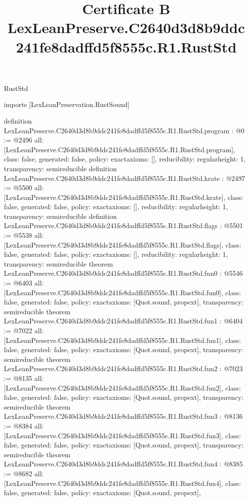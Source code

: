 \begin{lexlean}{RustStd}
\title{Certificate B LexLeanPreserve.C2640d3d8b9ddc241fe8dadffd5f8555c.R1.RustStd}
\begin{coremodule}
imports [LexLeanPreservation.RustSound]

definition LexLeanPreserve.C2640d3d8b9ddc241fe8dadffd5f8555c.R1.RustStd.program : @0 := @2496 {
  all: [LexLeanPreserve.C2640d3d8b9ddc241fe8dadffd5f8555c.R1.RustStd.program],
  class: false,
  generated: false,
  policy: exact{axioms: []},
  reducibility: regular{height: 1},
  transparency: semireducible
}
definition LexLeanPreserve.C2640d3d8b9ddc241fe8dadffd5f8555c.R1.RustStd.krate : @2497 := @5500 {
  all: [LexLeanPreserve.C2640d3d8b9ddc241fe8dadffd5f8555c.R1.RustStd.krate],
  class: false,
  generated: false,
  policy: exact{axioms: []},
  reducibility: regular{height: 1},
  transparency: semireducible
}
definition LexLeanPreserve.C2640d3d8b9ddc241fe8dadffd5f8555c.R1.RustStd.flags : @5501 := @5538 {
  all: [LexLeanPreserve.C2640d3d8b9ddc241fe8dadffd5f8555c.R1.RustStd.flags],
  class: false,
  generated: false,
  policy: exact{axioms: []},
  reducibility: regular{height: 1},
  transparency: semireducible
}
theorem LexLeanPreserve.C2640d3d8b9ddc241fe8dadffd5f8555c.R1.RustStd.fun0 : @5546 := @6403 {
  all: [LexLeanPreserve.C2640d3d8b9ddc241fe8dadffd5f8555c.R1.RustStd.fun0],
  class: false,
  generated: false,
  policy: exact{axioms: [Quot.sound, propext]},
  transparency: semireducible
}
theorem LexLeanPreserve.C2640d3d8b9ddc241fe8dadffd5f8555c.R1.RustStd.fun1 : @6404 := @7022 {
  all: [LexLeanPreserve.C2640d3d8b9ddc241fe8dadffd5f8555c.R1.RustStd.fun1],
  class: false,
  generated: false,
  policy: exact{axioms: [Quot.sound, propext]},
  transparency: semireducible
}
theorem LexLeanPreserve.C2640d3d8b9ddc241fe8dadffd5f8555c.R1.RustStd.fun2 : @7023 := @8135 {
  all: [LexLeanPreserve.C2640d3d8b9ddc241fe8dadffd5f8555c.R1.RustStd.fun2],
  class: false,
  generated: false,
  policy: exact{axioms: [Quot.sound, propext]},
  transparency: semireducible
}
theorem LexLeanPreserve.C2640d3d8b9ddc241fe8dadffd5f8555c.R1.RustStd.fun3 : @8136 := @8384 {
  all: [LexLeanPreserve.C2640d3d8b9ddc241fe8dadffd5f8555c.R1.RustStd.fun3],
  class: false,
  generated: false,
  policy: exact{axioms: [Quot.sound, propext]},
  transparency: semireducible
}
theorem LexLeanPreserve.C2640d3d8b9ddc241fe8dadffd5f8555c.R1.RustStd.fun4 : @8385 := @8682 {
  all: [LexLeanPreserve.C2640d3d8b9ddc241fe8dadffd5f8555c.R1.RustStd.fun4],
  class: false,
  generated: false,
  policy: exact{axioms: [Quot.sound, propext]},
}
\end{coremodule}
\end{lexlean}
